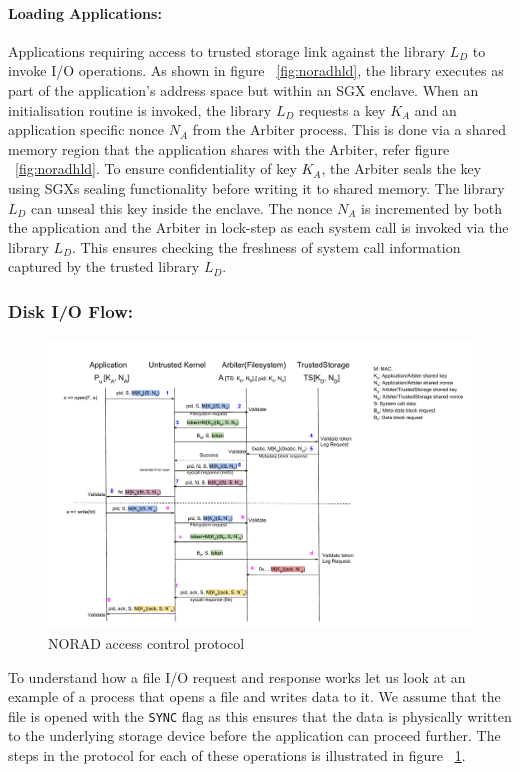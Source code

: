 \documentclass[withindex,glossary]{cam-thesis}
\begin{document}
\paragraph{Loading Applications:}
Applications requiring access to trusted storage link against the library $L_D$ to invoke I/O operations.
As shown in figure ~\ref{fig:noradhld}, the library executes as part of the application's address space but within an SGX enclave.
When an initialisation routine is invoked, the library $L_D$ requests a key $K_A$ and an application specific nonce $N_A$ from the Arbiter process.
This is done via a shared memory region that the application shares with the Arbiter, refer figure ~\ref{fig:noradhld}.
To ensure confidentiality of key $K_A$, the Arbiter seals the key using SGXs sealing functionality before writing it to shared memory.
The library $L_D$ can unseal this key inside the enclave.
The nonce $N_A$ is incremented by both the application and the Arbiter in lock-step as each system call is invoked via the library $L_D$.
This ensures checking the freshness of system call information captured by the trusted library $L_D$.

\subsubsection{Disk I/O Flow:}

\begin{figure}[t!]
  \centering
    \includegraphics[width=1.0\columnwidth]{norad_access_control}
  \caption{NORAD access control protocol}
  \label{fig:noradproto}
\end{figure}

To understand how a file I/O request and response works let us look at an example of a process that opens a file and writes data to it.
We assume that the file is opened with the \texttt{SYNC} flag as this ensures that the data is physically written to the underlying storage device before the application can proceed further.
The steps in the protocol for each of these operations is illustrated in figure ~\ref{fig:noradproto}.
\end{document}
